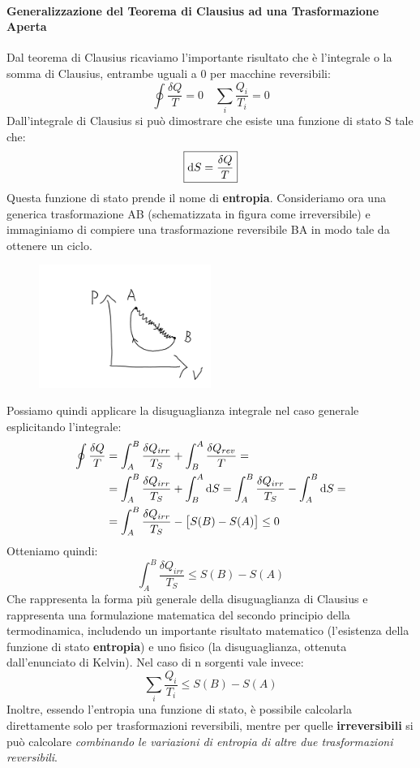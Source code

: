 \documentclass{article}
\newcommand{\note}{\noindent {\quad \bf \underline{Osservazione:}} \quad}
\begin{document}
\paragraph{Generalizzazione del Teorema di Clausius ad una Trasformazione Aperta}
Dal teorema di Clausius ricaviamo l'importante risultato che è l'integrale o la somma di Clausius, entrambe uguali a 0 per macchine reversibili:
\[\oint\frac{\delta Q}{T}=0\quad\sum_i\frac{Q_i}{T_i}=0\]
Dall'integrale di Clausius si può dimostrare che esiste una funzione di stato S tale che:
\begin{equation}
\boxed{\dif S=\frac{\delta Q}{T}}
\end{equation}
Questa funzione di stato prende il nome di \textbf{entropia}.
Consideriamo ora una generica trasformazione AB (schematizzata in figura come irreversibile) e immaginiamo di compiere una trasformazione reversibile BA in modo tale da ottenere un ciclo. 
\begin{figure}[H]
    \centering
    \includegraphics[width=0.5\textwidth]{TrasfAperta.png}
    \label{TrasformazioneAperta}
\end{figure}
Possiamo quindi applicare la disuguaglianza integrale nel caso generale esplicitando l'integrale:
\begin{equation}
\begin{split}
    \oint\frac{\delta Q}{T}&=\int_A^B\frac{\delta Q_{irr}}{T_S}+\int_B^A\frac{\delta Q_{rev}}{T}=\\
    &=\int_A^B\frac{\delta Q_{irr}}{T_S}+\int_B^A\dif S=\int_A^B\frac{\delta Q_{irr}}{T_S}-\int_A^B\dif S=\\
    &=\int_A^B\frac{\delta Q_{irr}}{T_S}-\left[S(B)-S(A)\right]\leq 0
\end{split}
\end{equation}
Otteniamo quindi:
\[\boxed{\int_A^B\frac{\delta Q_{irr}}{T_S}\leq S(B)-S(A)}\]
Che rappresenta la forma più generale della disuguaglianza di Clausius e rappresenta una formulazione matematica del secondo principio della termodinamica, includendo un importante risultato matematico (l'esistenza della funzione di stato \textbf{entropia}) e uno fisico (la disuguaglianza, ottenuta dall'enunciato di Kelvin).
\note Nel caso di n sorgenti vale invece:
\[\sum_i\frac{Q_i}{T_i}\leq S(B)-S(A)\]
Inoltre, essendo l'entropia una funzione di stato, è possibile calcolarla direttamente solo per trasformazioni reversibili, mentre per quelle \textbf{irreversibili} si può calcolare \textit{combinando le variazioni di entropia di altre due trasformazioni reversibili}.
\end{document}
